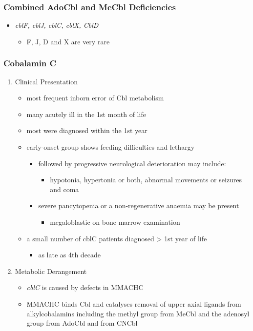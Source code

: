 \documentclass{scrartcl}
\begin{document}
\subsubsection{Combined AdoCbl and MeCbl Deficiencies}
\label{sec:org6045691}
\begin{itemize}
\item \emph{cblF, cblJ, cblC, cblX, CblD}
\begin{itemize}
\item F, J, D and X are very rare
\end{itemize}
\end{itemize}
\subsubsection{Cobalamin C}
\label{sec:org14fcb50}
\begin{enumerate}
\item Clinical Presentation
\label{sec:orgc584f8d}
\begin{itemize}
\item most frequent inborn error of Cbl metabolism
\item many acutely ill in the 1st month of life
\item most were diagnosed within the 1st year
\item early-onset group shows feeding difficulties and lethargy
\begin{itemize}
\item followed by progressive neurological deterioration may include: 
\begin{itemize}
\item hypotonia, hypertonia or both, abnormal movements or seizures
and coma
\end{itemize}
\item severe pancytopenia or a non-regenerative anaemia may be present
\begin{itemize}
\item megaloblastic on bone marrow examination
\end{itemize}
\end{itemize}
\item a small number of cblC patients diagnosed \textgreater{} 1st year of life
\begin{itemize}
\item as late as 4th decade
\end{itemize}
\end{itemize}

\item Metabolic Derangement
\label{sec:orga4b6f06}
\begin{itemize}
\item \emph{cblC} is caused by defects in MMACHC
\item MMACHC binds Cbl and catalyses removal of upper axial ligands from
alkylcobalamins including the methyl group from MeCbl and the
adenosyl group from AdoCbl and from CNCbl
\end{itemize}


\end{enumerate}
\end{document}
